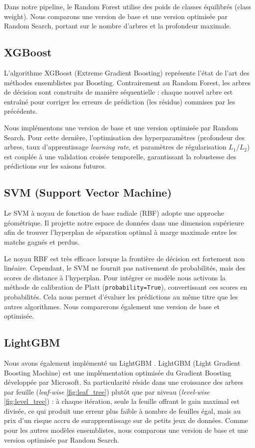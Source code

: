 Dans notre pipeline, le Random Forest utilise des poids de classes équilibrés 
(class weight).
Nous comparons une version de base et une version 
optimisée par Random Search, portant sur le nombre d'arbres et la profondeur maximale. 

\subsection{XGBoost}

L'algorithme XGBoost (Extreme Gradient Boosting) représente l'état de l'art des 
méthodes ensemblistes par Boosting. Contrairement au Random Forest, les arbres 
de décision sont construits de manière séquentielle : chaque nouvel arbre est 
entraîné pour corriger les erreurs de prédiction (les résidus) commises par les 
précédents.

Nous implémentons une version de base et une version 
optimisée par Random Search. Pour cette dernière, l'optimisation des hyperparamètres 
(profondeur des arbres, taux d'apprentissage \textit{learning rate}, et paramètres 
de régularisation $L_1$/$L_2$) est couplée à une validation croisée temporelle, 
garantissant la robustesse des prédictions sur les saisons futures.

\subsection{SVM (Support Vector Machine)}

Le SVM à noyau de fonction de base radiale (RBF) adopte une approche géométrique. 
Il projette notre espace de données dans une 
dimension supérieure afin de trouver l'hyperplan de séparation optimal à marge 
maximale entre les matchs gagnés et perdus.

Le noyau RBF est très efficace lorsque la frontière de décision est fortement 
non linéaire. Cependant, le SVM ne fournit pas nativement de probabilités, mais 
des scores de distance à l'hyperplan. Pour intégrer ce modèle nous activons la méthode 
de calibration de Platt (\texttt{probability=True}), 
convertissant ces scores en probabilités. Cela nous permet d'évaluer les prédictions 
au même titre que les autres algorithmes. Nous comparerons également une 
version de base et optimisée.

\subsection{LightGBM}

Nous avons également implémenté un LightGBM \cite{chenlgbm}. 
LightGBM (Light Gradient Boosting Machine) est une implémentation 
optimisée du Gradient Boosting développée par Microsoft. Sa particularité réside dans une 
croissance des arbres par feuille (\textit{leaf-wise} \ref{fig:leaf_tree}) plutôt que par niveau 
(\textit{level-wise} \ref{fig:level_tree}) : à chaque itération, seule la feuille offrant le 
gain maximal est divisée, ce qui produit une 
erreur plus faible à nombre de feuilles égal, mais au prix d'un risque accru de surapprentissage 
sur de petits jeux de données. Comme pour les autres modèles ensemblistes, nous comparons une version 
de base et une version optimisée par Random Search.

